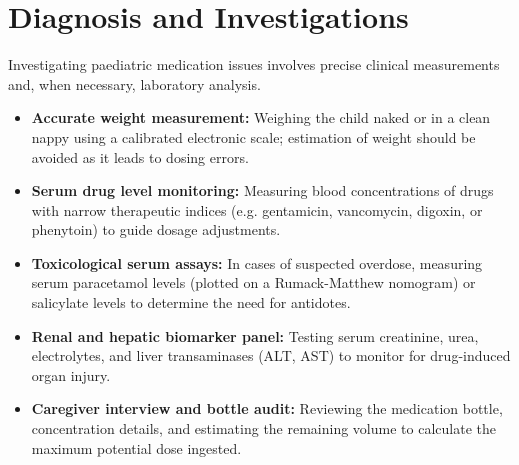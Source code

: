 \section*{Diagnosis and Investigations}
Investigating paediatric medication issues involves precise clinical measurements and, when necessary, laboratory analysis.
\begin{itemize}
    \item \textbf{Accurate weight measurement:} Weighing the child naked or in a clean nappy using a calibrated electronic scale; estimation of weight should be avoided as it leads to dosing errors.
    \item \textbf{Serum drug level monitoring:} Measuring blood concentrations of drugs with narrow therapeutic indices (e.g. gentamicin, vancomycin, digoxin, or phenytoin) to guide dosage adjustments.
    \item \textbf{Toxicological serum assays:} In cases of suspected overdose, measuring serum paracetamol levels (plotted on a Rumack-Matthew nomogram) or salicylate levels to determine the need for antidotes.
    \item \textbf{Renal and hepatic biomarker panel:} Testing serum creatinine, urea, electrolytes, and liver transaminases (ALT, AST) to monitor for drug-induced organ injury.
    \item \textbf{Caregiver interview and bottle audit:} Reviewing the medication bottle, concentration details, and estimating the remaining volume to calculate the maximum potential dose ingested.
\end{itemize}

